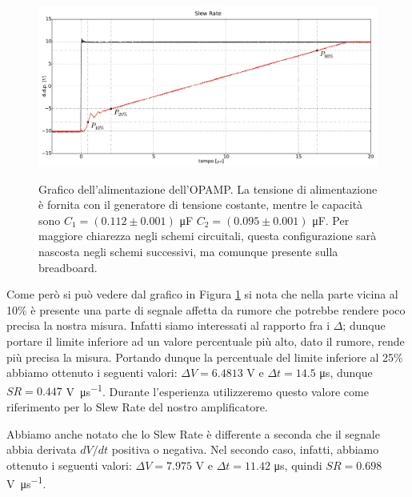 \begin{figure}[ht]
 \centering
   {\includegraphics[width=16.5cm]{../E03/latex/sr_up.pdf}}
 \caption{Grafico dell'alimentazione dell'OPAMP. La tensione di alimentazione è fornita con il generatore di tensione costante, mentre le capacità sono $C_1=(0.112 \pm 0.001)$ \si{\micro\farad} $C_2=(0.095\pm0.001)$ \si{\micro\farad}. Per maggiore chiarezza negli schemi circuitali, questa configurazione sarà nascosta negli schemi successivi, ma comunque presente sulla breadboard.}
 \label{gr3:slew_rate}
\end{figure}

Come però si può vedere dal grafico in Figura \ref{gr3:slew_rate} si nota che nella parte vicina al 10\% è presente una parte di segnale affetta da rumore che potrebbe rendere poco precisa la nostra misura. Infatti siamo interessati al rapporto fra i $\Delta$; dunque portare il limite inferiore ad un valore percentuale più alto, dato il rumore, rende più precisa la misura. Portando dunque la percentuale del limite inferiore al 25\% abbiamo ottenuto i seguenti valori: $\Delta V = 6.4813$ \si{\volt} e $\Delta t = 14.5$ \si{\micro\second}, dunque $SR = 0.447$ \si{\volt\per\micro\second}. Durante l'esperienza utilizzeremo questo valore come riferimento per lo Slew Rate del nostro amplificatore.

Abbiamo anche notato che lo Slew Rate è differente a seconda che il segnale abbia derivata $dV/dt$ positiva o negativa. Nel secondo caso, infatti, abbiamo ottenuto i seguenti valori: $\Delta V = 7.975$ \si{\volt} e $\Delta t = 11.42$ \si{\micro\second}, quindi $SR = 0.698$ \si{\volt\per\micro\second}.